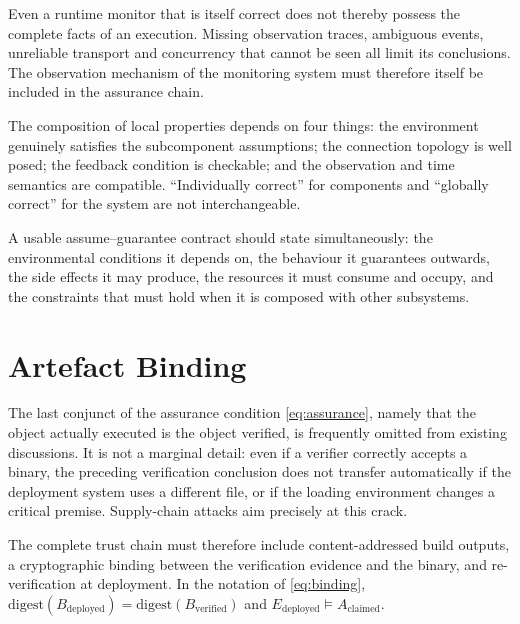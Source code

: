 \begin{remark}\label{rmk:monitor-limit}
Even a runtime monitor that is itself correct does not thereby possess the complete facts of
an execution. Missing observation traces, ambiguous events, unreliable transport and
concurrency that cannot be seen all limit its conclusions. The observation mechanism of the
monitoring system must therefore itself be included in the assurance chain.
\end{remark}

\begin{remark}\label{rmk:contract-conds}
The composition of local properties depends on four things: the environment genuinely
satisfies the subcomponent assumptions; the connection topology is well posed; the feedback
condition is checkable; and the observation and time semantics are compatible. ``Individually
correct'' for components and ``globally correct'' for the system are not interchangeable.
\end{remark}

\begin{principle}\label{pr:ag}
A usable assume--guarantee contract should state simultaneously: the environmental
conditions it depends on, the behaviour it guarantees outwards, the side effects it may
produce, the resources it must consume and occupy, and the constraints that must hold when
it is composed with other subsystems.
\end{principle}

\section{Artefact Binding}\label{sec:fourth}

The last conjunct of the assurance condition \eqref{eq:assurance}, namely that the object
actually executed is the object verified, is frequently omitted from existing discussions.
It is not a marginal detail: even if a verifier correctly accepts a binary, the preceding
verification conclusion does not transfer automatically if the deployment system uses a
different file, or if the loading environment changes a critical premise. Supply-chain
attacks aim precisely at this crack.

The complete trust chain must therefore include content-addressed build outputs, a
cryptographic binding between the verification evidence and the binary, and re-verification
at deployment. In the notation of \eqref{eq:binding},
$\mathrm{digest}(B_{\text{deployed}}) = \mathrm{digest}(B_{\text{verified}})$
and $E_{\text{deployed}} \models A_{\text{claimed}}$.

